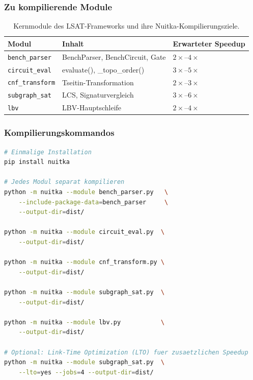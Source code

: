﻿\documentclass[a4paper,12pt]{article}
\theoremstyle{definition}
\begin{document}
\subsubsection{Zu kompilierende Module}

\begin{table}[h]
  \centering
  \begin{tabular}{lll}
    \toprule
    \textbf{Modul} & \textbf{Inhalt} & \textbf{Erwarteter Speedup} \\
    \midrule
    \texttt{bench\_parser} & BenchParser, BenchCircuit, Gate & $2\times$--$4\times$ \\
    \texttt{circuit\_eval} & evaluate(), \_topo\_order()      & $3\times$--$5\times$ \\
    \texttt{cnf\_transform} & Tseitin-Transformation          & $2\times$--$3\times$ \\
    \texttt{subgraph\_sat}  & LCS, Signaturvergleich           & $3\times$--$6\times$ \\
    \texttt{lbv}            & LBV-Hauptschleife               & $2\times$--$4\times$ \\
    \bottomrule
  \end{tabular}
  \caption{Kernmodule des LSAT-Frameworks und ihre Nuitka-Kompilierungsziele.}
  \label{tab:nuitka-module}
\end{table}

\subsubsection{Kompilierungskommandos}

\begin{lstlisting}[language=bash, caption={Nuitka-Kompilierung der LSAT-Kernmodule}]
# Einmalige Installation
pip install nuitka

# Jedes Modul separat kompilieren
python -m nuitka --module bench_parser.py   \
    --include-package-data=bench_parser     \
    --output-dir=dist/

python -m nuitka --module circuit_eval.py  \
    --output-dir=dist/

python -m nuitka --module cnf_transform.py \
    --output-dir=dist/

python -m nuitka --module subgraph_sat.py  \
    --output-dir=dist/

python -m nuitka --module lbv.py           \
    --output-dir=dist/

# Optional: Link-Time Optimization (LTO) fuer zusaetzlichen Speedup
python -m nuitka --module subgraph_sat.py  \
    --lto=yes --jobs=4 --output-dir=dist/
\end{lstlisting}
\end{document}
